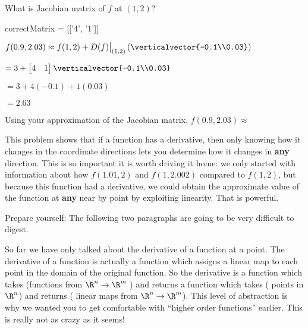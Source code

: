 \documentclass{ximera}
\begin{document}
\begin{question}
\begin{solution}
	What is Jacobian matrix of $f$ at $(1,2)$?
	\begin{matrix-answer}[name = M]
		correctMatrix = [['4', '1']]
	\end{matrix-answer}
\end{solution}

\begin{solution} 
	\begin{hint}
		$f(0.9,2.03) \approx f(1,2) +D(f)\big|_{(1,2)}\left(\verticalvector{-0.1\\0.03}\right)$
	\end{hint}
	\begin{hint}
		$ = 3 + \begin{bmatrix} 4 & 1\end{bmatrix}\verticalvector{-0.1\\0.03}$
	\end{hint}
	\begin{hint}
		$ = 3+4(-0.1)+1(0.03)$
		
		$= 2.63$
	\end{hint}
	Using your approximation of the  Jacobian matrix, $f(0.9,2.03) \approx $ 
\end{solution}
This problem shows that if a function has a derivative, then only knowing how it changes in the coordinate directions lets you determine how it changes in \textbf{any} 
direction.  This is so important it is worth driving it home:  we only started with information about how $f(1.01,2)$ and $f(1,2.002)$ compared to $f(1,2)$, but because
this function had a derivative, we could obtain the approximate value of the function at \textbf{any} near by point by exploiting linearity.  That is powerful.
\end{question}


Prepare yourself:  The following two paragraphs are going to be very difficult to digest.

So far we have only talked about the derivative of a function at a point.  The derivative of a function is actually a function which assigns a linear map
to each point in the domain of the original function.   So the derivative is a function which takes (functions from $\R^n \to \R^m$ ) and 
returns  a function which takes ( points in $\R^n$) and  returns ( linear maps from $\R^n \to \R^m$).    This level of abstraction is why we 
wanted you to get comfortable with ``higher order functions'' earlier.  This is really not as crazy as it seems!
\end{document}
